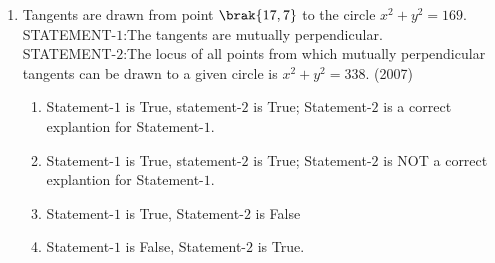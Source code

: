 	\begin{enumerate}
\item Tangents are drawn from point $\brak{17,  7}$ to the circle $x^2+y^2=169$.\\
STATEMENT-$1$:The tangents are mutually perpendicular.\\
STATEMENT-$2$:The locus of all points from which mutually perpendicular tangents can be drawn to a given circle is $x^2+y^2=338$. \hfill(2007)
\begin{enumerate}
\item Statement-$1$ is True, statement-$2$ is True; Statement-$2$ is a correct explantion for Statement-$1$.
\item Statement-$1$ is True, statement-$2$ is True; Statement-$2$ is NOT a correct explantion for Statement-$1$.
\item Statement-$1$ is True,  Statement-$2$ is False
\item Statement-$1$ is False,  Statement-$2$ is True.
\end{enumerate}


\end{enumerate}
